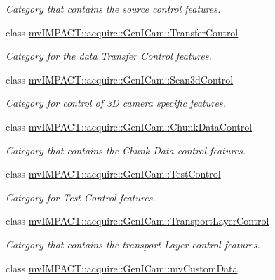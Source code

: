 \begin{DoxyCompactItemize}
\begin{DoxyCompactList}\small\item\em Category that contains the source control features. \end{DoxyCompactList}\item 
class \hyperlink{classmv_i_m_p_a_c_t_1_1acquire_1_1_gen_i_cam_1_1_transfer_control}{mv\+I\+M\+P\+A\+C\+T\+::acquire\+::\+Gen\+I\+Cam\+::\+Transfer\+Control}
\begin{DoxyCompactList}\small\item\em Category for the data Transfer Control features. \end{DoxyCompactList}\item 
class \hyperlink{classmv_i_m_p_a_c_t_1_1acquire_1_1_gen_i_cam_1_1_scan3d_control}{mv\+I\+M\+P\+A\+C\+T\+::acquire\+::\+Gen\+I\+Cam\+::\+Scan3d\+Control}
\begin{DoxyCompactList}\small\item\em Category for control of 3\+D camera specific features. \end{DoxyCompactList}\item 
class \hyperlink{classmv_i_m_p_a_c_t_1_1acquire_1_1_gen_i_cam_1_1_chunk_data_control}{mv\+I\+M\+P\+A\+C\+T\+::acquire\+::\+Gen\+I\+Cam\+::\+Chunk\+Data\+Control}
\begin{DoxyCompactList}\small\item\em Category that contains the Chunk Data control features. \end{DoxyCompactList}\item 
class \hyperlink{classmv_i_m_p_a_c_t_1_1acquire_1_1_gen_i_cam_1_1_test_control}{mv\+I\+M\+P\+A\+C\+T\+::acquire\+::\+Gen\+I\+Cam\+::\+Test\+Control}
\begin{DoxyCompactList}\small\item\em Category for Test Control features. \end{DoxyCompactList}\item 
class \hyperlink{classmv_i_m_p_a_c_t_1_1acquire_1_1_gen_i_cam_1_1_transport_layer_control}{mv\+I\+M\+P\+A\+C\+T\+::acquire\+::\+Gen\+I\+Cam\+::\+Transport\+Layer\+Control}
\begin{DoxyCompactList}\small\item\em Category that contains the transport Layer control features. \end{DoxyCompactList}\item 
class \hyperlink{classmv_i_m_p_a_c_t_1_1acquire_1_1_gen_i_cam_1_1mv_custom_data}{mv\+I\+M\+P\+A\+C\+T\+::acquire\+::\+Gen\+I\+Cam\+::mv\+Custom\+Data}

\end{DoxyCompactItemize}
